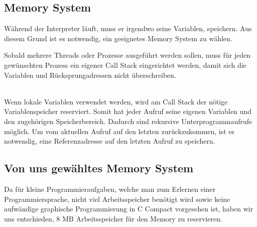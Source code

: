 

\subsection{Memory System}
\label{sec:memory_system}
Während der Interpreter läuft, muss er irgendwo seine Variablen, speichern. Aus diesem Grund ist es notwendig, ein geeignetes Memory System zu wählen.


Sobald mehrere Threads oder Prozesse ausgeführt werden sollen, muss für jeden gewünschten Prozess ein eigener Call Stack eingerichtet
werden, damit sich die Variablen und Rücksprungadressen nicht überschreiben.

\\
Wenn lokale Variablen verwendet werden, wird am Call Stack der nötige Variablenspeicher reserviert. Somit hat jeder Aufruf seine eigenen Variablen und den zugehörigen Speicherbereich. Dadurch sind rekursive Unterprogrammaufrufe möglich. Um vom aktuellen Aufruf auf den letzten zurückzukommen, ist es notwendig, eine Referenzadresse auf den letzten Aufruf zu speichern.

\subsection{Von uns gewähltes Memory System}
Da für kleine Programmieraufgaben, welche man zum Erlernen einer Programmiersprache, nicht viel Arbeitsspeicher benötigt wird sowie keine aufwändige graphische Programmierung in C Compact vorgesehen ist, haben wir uns entschieden, 8 MB Arbeitsspeicher für den Memory zu reservieren.

